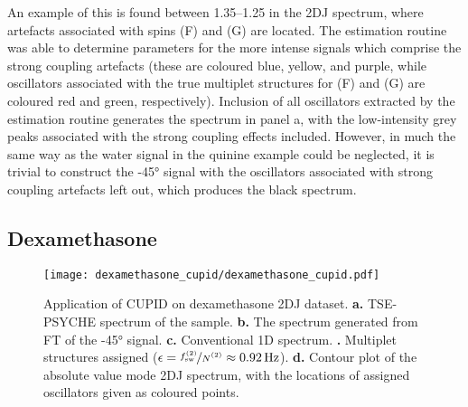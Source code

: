 An example of this is found between \SIrange{1.35}{1.25}{\partspermillion} in
the \ac{2DJ} spectrum, where artefacts associated with spins (F) and (G) are
located.
The estimation routine was able to determine parameters for
the more intense signals which comprise the strong coupling artefacts (these
are coloured blue, yellow, and purple, while oscillators associated with the
true multiplet structures for (F) and (G) are coloured red and green, respectively).
Inclusion of all oscillators extracted by the estimation routine generates the
spectrum in panel a, with the low-intensity grey peaks associated with the strong
coupling effects included. However, in much the same way as the water signal in
the quinine example could be neglected, it is trivial to construct the \ang{-45}
signal with the oscillators associated with strong coupling artefacts left out,
which produces the black spectrum.

\subsection{Dexamethasone}
\begin{sidewaysfigure}%
    \centering%
    \texttt{[image: dexamethasone\_cupid/dexamethasone\_cupid.pdf]}%
    \caption[
        Application of \acs{CUPID} on a dexamethasone dataset.
    ]{
        Application of \acs{CUPID} on dexamethasone \ac{2DJ} dataset.
        \textbf{a.} \acs{TSE-PSYCHE} spectrum of the sample.
        \textbf{b.} The spectrum generated from \ac{FT} of the \ang{-45}
        signal.
        \textbf{c.} Conventional \acs{1D} spectrum.
        \textbf{.} Multiplet structures assigned ($\epsilon =
        \nicefrac{\fswtwo}{\Ntwo} \approx \qty{0.92}{\hertz}$).
        \textbf{d.} Contour plot of the absolute value mode \acs{2DJ} spectrum,
        with the locations of assigned oscillators given as coloured points.
    }
    \label{fig:dexamethasone-cupid}%
\end{sidewaysfigure}%

